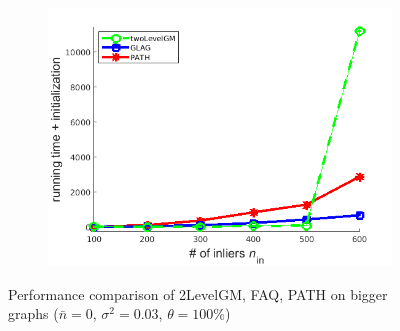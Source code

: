 \begin{figure}[h]
\begin{subfigure}[b]{0.3\textwidth}
			\includegraphics[scale=0.25]{"chapter3/fig/SyntheticTest_BigGraphs/descr/Results_v4.3.3/Test2/time_summary_avg1t"} 
		\end{subfigure} 	
	\caption[Performance comparison of 2LevelGM, FAQ, PATH on bigger graphs: test $2$]{Performance comparison of 2LevelGM, FAQ, PATH on bigger graphs ($\bar{n}=0$, $\sigma^2=0.03$, $\theta=100\%$)}
	\label{fig:synTest2_bigGraphs_ver433}
\end{figure}
